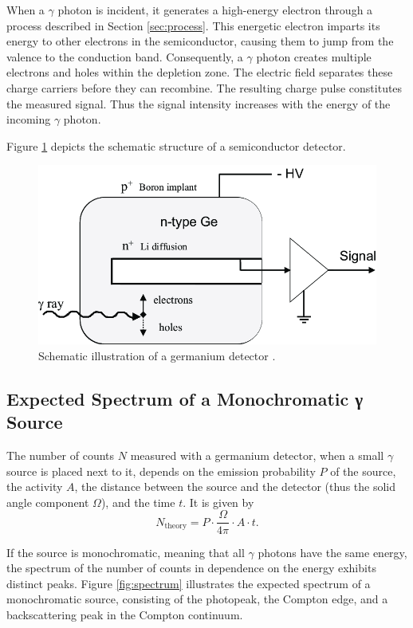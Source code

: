 \noindent
When a $\gamma$ photon is incident, it generates a high-energy 
electron through a process described in Section \ref{sec:process}. 
This energetic electron imparts its energy to other electrons in 
the semiconductor, causing them to jump from the valence to the 
conduction band. Consequently, a $\gamma$ photon creates multiple 
electrons and holes within the depletion zone. The electric field 
separates these charge carriers before they can recombine. The 
resulting charge pulse constitutes the measured signal. Thus the signal 
intensity increases with the energy of the incoming $\gamma$ photon.

\noindent
Figure \ref{fig:detector} depicts the schematic structure of a 
semiconductor detector.

\begin{figure}
    \centering
    \includegraphics[scale=0.4]{pictures/detector.png}
    \caption{Schematic illustration of a germanium detector \cite{detector}.}
    \label{fig:detector}
\end{figure}

\subsection{Expected Spectrum of a Monochromatic γ Source}
The number of counts $N$ measured with a germanium detector, when a small 
$\gamma$ source is placed next to it, depends on the emission probability 
$P$ of the source, the activity $A$, the distance between the source and 
the detector (thus the solid angle component $\Omega$), and the time $t$. 
It is given by
\begin{equation}
    N_\text{theory} =  P \cdot \frac{\Omega}{4 \pi} \cdot A \cdot t.
\end{equation}

\noindent
If the source is monochromatic, meaning that all $\gamma$ photons have 
the same energy, the spectrum of the number of counts in dependence on 
the energy exhibits distinct peaks. Figure \ref{fig:spectrum} illustrates 
the expected spectrum of a monochromatic source, consisting of the 
photopeak, the Compton edge, and a backscattering peak in the Compton 
continuum. 

